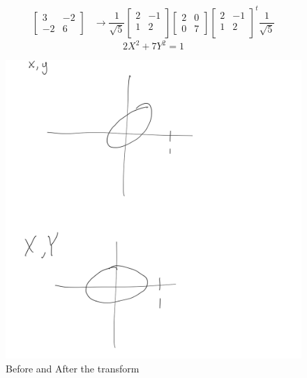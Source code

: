 \documentclass[12pt]{article}
\begin{document}
\section{} %
\begin{align*}
	\begin{bmatrix}
		3 & -2\\
		-2 & 6
	\end{bmatrix}
		&\longrightarrow \dfrac{1}{\sqrt{5}}
		\begin{bmatrix}
			2 & -1\\
			1 & 2\\
		\end{bmatrix}
		\begin{bmatrix}
			2 & 0\\
			0 & 7
		\end{bmatrix}
		\begin{bmatrix}
			2 & -1\\
			1 & 2\\
		\end{bmatrix}^t
		\dfrac{1}{\sqrt{5}}
\end{align*}
\[ 2X^2 + 7Y^2 = 1 \]
\begin{figure}[H]
	\centering
	\includegraphics[width=\textwidth]{images/5.png}
	\caption{Before and After the transform}
	\label{fig:5}
\end{figure}
\newpage
\end{document}
